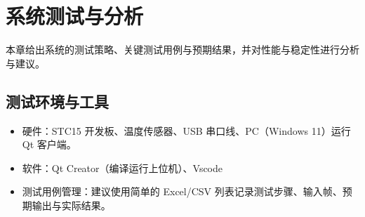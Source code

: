 \documentclass[12pt]{article}
\begin{document}

\section{系统测试与分析}
本章给出系统的测试策略、关键测试用例与预期结果，并对性能与稳定性进行分析与建议。

\subsection{测试环境与工具}
\begin{itemize}
\item 硬件：STC15 开发板、温度传感器、USB 串口线、PC（Windows 11）运行 Qt 客户端。
\item 软件：Qt Creator（编译运行上位机）、Vscode
\item 测试用例管理：建议使用简单的 Excel/CSV 列表记录测试步骤、输入帧、预期输出与实际结果。
\end{itemize}
\end{document}
